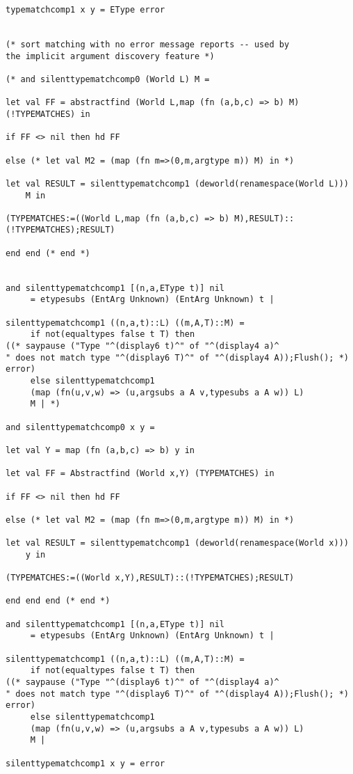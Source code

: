 \documentclass{article}
\begin{document}
\begin{verbatim}
typematchcomp1 x y = EType error


(* sort matching with no error message reports -- used by
the implicit argument discovery feature *)

(* and silenttypematchcomp0 (World L) M = 

let val FF = abstractfind (World L,map (fn (a,b,c) => b) M) (!TYPEMATCHES) in

if FF <> nil then hd FF

else (* let val M2 = (map (fn m=>(0,m,argtype m)) M) in *)

let val RESULT = silenttypematchcomp1 (deworld(renamespace(World L)))
    M in

(TYPEMATCHES:=((World L,map (fn (a,b,c) => b) M),RESULT)::(!TYPEMATCHES);RESULT)

end end (* end *)


and silenttypematchcomp1 [(n,a,EType t)] nil 
     = etypesubs (EntArg Unknown) (EntArg Unknown) t |

silenttypematchcomp1 ((n,a,t)::L) ((m,A,T)::M) =
     if not(equaltypes false t T) then 
((* saypause ("Type "^(display6 t)^" of "^(display4 a)^
" does not match type "^(display6 T)^" of "^(display4 A));Flush(); *) error)
     else silenttypematchcomp1
     (map (fn(u,v,w) => (u,argsubs a A v,typesubs a A w)) L)
     M | *)

and silenttypematchcomp0 x y =

let val Y = map (fn (a,b,c) => b) y in

let val FF = Abstractfind (World x,Y) (TYPEMATCHES) in

if FF <> nil then hd FF

else (* let val M2 = (map (fn m=>(0,m,argtype m)) M) in *)

let val RESULT = silenttypematchcomp1 (deworld(renamespace(World x)))
    y in

(TYPEMATCHES:=((World x,Y),RESULT)::(!TYPEMATCHES);RESULT)

end end end (* end *)

and silenttypematchcomp1 [(n,a,EType t)] nil 
     = etypesubs (EntArg Unknown) (EntArg Unknown) t |

silenttypematchcomp1 ((n,a,t)::L) ((m,A,T)::M) =
     if not(equaltypes false t T) then 
((* saypause ("Type "^(display6 t)^" of "^(display4 a)^
" does not match type "^(display6 T)^" of "^(display4 A));Flush(); *) error)
     else silenttypematchcomp1
     (map (fn(u,v,w) => (u,argsubs a A v,typesubs a A w)) L)
     M |

silenttypematchcomp1 x y = error



\end{verbatim}
\end{document}
